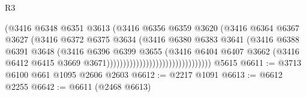\begin{lexlean}{R3}
\begin{coremodule}
                                                  (@3416
                                                    @6348
                                                    @6351
                                                    @3613
                                                    (@3416
                                                      @6356
                                                      @6359
                                                      @3620
                                                      (@3416
                                                        @6364
                                                        @6367
                                                        @3627
                                                        (@3416
                                                          @6372
                                                          @6375
                                                          @3634
                                                          (@3416
                                                            @6380
                                                            @6383
                                                            @3641
                                                            (@3416
                                                              @6388
                                                              @6391
                                                              @3648
                                                              (@3416
                                                                @6396
                                                                @6399
                                                                @3655
                                                                (@3416
                                                                  @6404
                                                                  @6407
                                                                  @3662
                                                                  (@3416
                                                                    @6412
                                                                    @6415
                                                                    @3669
                                                                    @3671))))))))))))))))))))))))))))))))
    @5615
@6611 := @3713 @6100 @661 @1095 @2606 @2603
@6612 := @2217 @1091
@6613 := @6612 @2255
@6642 := @6611
    (@2468 @6613)

\end{coremodule}
\end{lexlean}
